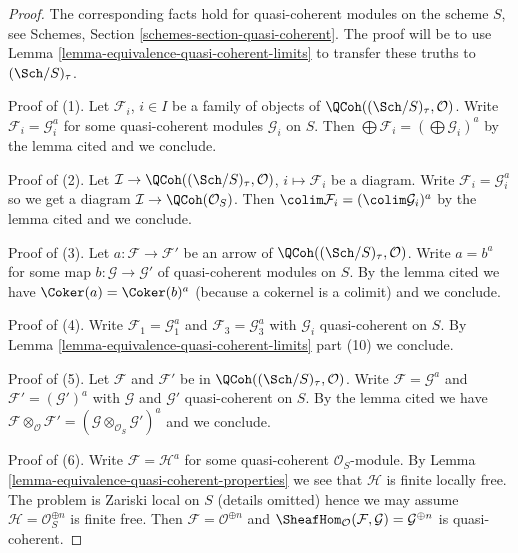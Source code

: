 \begin{proof}
The corresponding facts hold for quasi-coherent modules on the scheme $S$,
see Schemes, Section \ref{schemes-section-quasi-coherent}. The proof will
be to use Lemma \ref{lemma-equivalence-quasi-coherent-limits} to transfer
these truths to $(\Sch/S)_\tau$.

\medskip\noindent
Proof of (1). Let $\mathcal{F}_i$, $i \in I$ be a family of objects of
$\QCoh((\Sch/S)_\tau, \mathcal{O})$. Write $\mathcal{F}_i = \mathcal{G}_i^a$
for some quasi-coherent modules $\mathcal{G}_i$ on $S$.
Then $\bigoplus \mathcal{F}_i = (\bigoplus \mathcal{G}_i)^a$ by
the lemma cited and we conclude.

\medskip\noindent
Proof of (2). Let $\mathcal{I} \to \QCoh((\Sch/S)_\tau, \mathcal{O})$,
$i \mapsto \mathcal{F}_i$ be a diagram. Write
$\mathcal{F}_i = \mathcal{G}_i^a$ so we get a diagram
$\mathcal{I} \to \QCoh(\mathcal{O}_S)$.
Then $\colim \mathcal{F}_i = (\colim \mathcal{G}_i)^a$ by
the lemma cited and we conclude.

\medskip\noindent
Proof of (3). Let $a : \mathcal{F} \to \mathcal{F}'$
be an arrow of $\QCoh((\Sch/S)_\tau, \mathcal{O})$.
Write $a = b^a$ for some map $b : \mathcal{G} \to \mathcal{G}'$
of quasi-coherent modules on $S$. By the lemma cited
we have $\Coker(a) = \Coker(b)^a$ (because a cokernel is a colimit)
and we conclude.

\medskip\noindent
Proof of (4). Write $\mathcal{F}_1 = \mathcal{G}_1^a$
and $\mathcal{F}_3 = \mathcal{G}_3^a$ with
$\mathcal{G}_i$ quasi-coherent on $S$.
By Lemma \ref{lemma-equivalence-quasi-coherent-limits} part (10)
we conclude.

\medskip\noindent
Proof of (5). Let $\mathcal{F}$ and $\mathcal{F}'$ be in
$\QCoh((\Sch/S)_\tau, \mathcal{O})$. Write $\mathcal{F} = \mathcal{G}^a$
and $\mathcal{F}' = (\mathcal{G}')^a$
with $\mathcal{G}$ and $\mathcal{G}'$ quasi-coherent on $S$.
By the lemma cited we have
$\mathcal{F} \otimes_\mathcal{O} \mathcal{F}' =
(\mathcal{G} \otimes_{\mathcal{O}_S} \mathcal{G}')^a$
and we conclude.

\medskip\noindent
Proof of (6). Write $\mathcal{F} = \mathcal{H}^a$ for some
quasi-coherent $\mathcal{O}_S$-module. By
Lemma \ref{lemma-equivalence-quasi-coherent-properties}
we see that $\mathcal{H}$ is finite locally free.
The problem is Zariski local on $S$ (details omitted) hence
we may assume $\mathcal{H} = \mathcal{O}_S^{\oplus n}$ is
finite free. Then $\mathcal{F} = \mathcal{O}^{\oplus n}$
and $\SheafHom_\mathcal{O}(\mathcal{F}, \mathcal{G}) = \mathcal{G}^{\oplus n}$
is quasi-coherent.
\end{proof}

